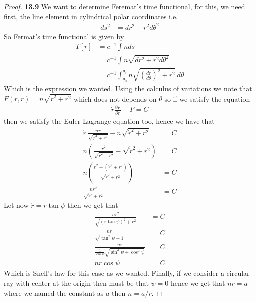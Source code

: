 \documentclass[11pt]{article}
\theoremstyle{definition}
\begin{document}
\begin{proof}{\textbf{13.9}}
    We want to determine Feremat's time functional, for this, we need 
    first, the line element in cylindrical polar coordinates i.e.
    \begin{align*}
        ds^2 &= dr^2 + r^2d\theta^2
    \end{align*}
    So Fermat's time functional is given by
    \begin{align*}
       T[r] &= c^{-1}\int n ds\\
        &= c^{-1}\int n \sqrt{dr^2 + r^2d\theta^2}\\
        &= c^{-1}\int_{\theta_0}^{\theta_1} n
        \sqrt{\left(\frac{dr}{d\theta}\right)^2 + r^2}~d\theta
    \end{align*}
    Which is the expression we wanted. Using the calculus of variations 
    we note that $F(r, \dot r) = n\sqrt{\dot r^2 + r^2}$ which does not
    depends on $\theta$ so if we satisfy the equation
    \begin{align*}
        \dot{r}\frac{\partial F}{\partial\dot{r}} - F = C
    \end{align*}
    then we satisfy the Euler-Lagrange equation too, hence we have that
    \begin{align*}
        \dot{r}~\frac{n\dot{r}}{\sqrt{\dot r^2 + r^2}} - n \sqrt{\dot r^2 + r^2} &= C\\
        n\left(\frac{\dot{r}^2}{\sqrt{\dot r^2 + r^2}} - \sqrt{\dot r^2 + r^2}\right) &= C\\
        n\left(\frac{\dot{r}^2 - (\dot{r}^2 + r^2)}{\sqrt{\dot r^2 + r^2}}\right) &= C\\
        \frac{nr^2}{\sqrt{\dot r^2 + r^2}} &= C
    \end{align*}
    Let now $\dot{r} = r \tan \psi$ then we get that
    \begin{align*}
        \frac{nr^2}{\sqrt{(r \tan \psi)^2 + r^2}} &= C\\
        \frac{nr}{\sqrt{\tan^2\psi + 1}} &= C\\
        \frac{nr}{\frac{1}{\cos\psi}\sqrt{\sin^2\psi + \cos^2\psi}} &= C\\
        nr\cos\psi &= C
    \end{align*}
    Which is Snell's law for this case as we wanted.
    Finally, if we consider a circular ray with center at the origin then must
    be that $\psi = 0$ hence we get that $nr = a$ where we named the constant
    as $a$ then $n = a/r$.
\end{proof}
\cleardoublepage
\end{document}
